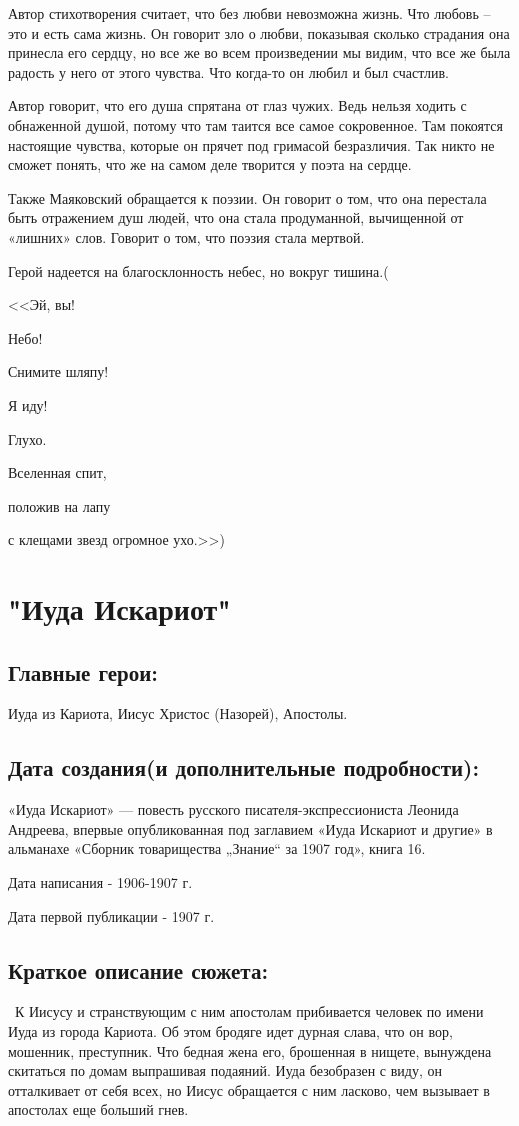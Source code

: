 \documentclass[a4paper,12pt]{article}
\begin{document}
	Автор стихотворения считает, что без любви невозможна жизнь. Что любовь – это и есть сама жизнь. Он говорит зло о любви, показывая сколько страдания она принесла его сердцу, но все же во всем произведении мы видим, что все же была радость у него от этого чувства. Что когда-то он любил и был счастлив.
	
	Автор говорит, что его душа спрятана от глаз чужих. Ведь нельзя ходить с обнаженной душой, потому что там таится все самое сокровенное. Там покоятся настоящие чувства, которые он прячет под гримасой безразличия. Так никто не сможет понять, что же на самом деле творится у поэта на сердце.
	
	Также Маяковский обращается к поэзии. Он говорит о том, что она перестала быть отражением душ людей, что она стала продуманной, вычищенной от «лишних» слов. Говорит о том, что поэзия стала мертвой.
	
	Герой надеется на благосклонность небес, но вокруг тишина.(
	
	<<Эй, вы!
	
	Небо!
	
	Снимите шляпу!
	
	Я иду!
	
	Глухо.
	
	Вселенная спит,
	
	положив на лапу
	
	с клещами звезд огромное ухо.>>)
	
	\section{"Иуда Искариот"}
	\subsection{Главные герои: }
	Иуда из Кариота, Иисус Христос (Назорей), Апостолы.
	\subsection{Дата создания(и дополнительные подробности): }
	«Иуда Искариот» — повесть русского писателя-экспрессиониста Леонида Андреева, впервые опубликованная под заглавием «Иуда Искариот и другие» в альманахе «Сборник товарищества „Знание“ за 1907 год», книга 16. 
	
	\noindent
	Дата написания - 1906-1907 г.
	
	\noindent
	Дата первой публикации - 1907 г.
	
	\subsection{Краткое описание сюжета: }
	\quad \, К Иисусу и странствующим с ним апостолам прибивается человек по имени Иуда из города Кариота. Об этом бродяге идет дурная слава, что он вор, мошенник, преступник. Что бедная жена его, брошенная в нищете, вынуждена скитаться по домам выпрашивая подаяний. Иуда безобразен с виду, он отталкивает от себя всех, но Иисус обращается с ним ласково, чем вызывает в апостолах еще больший гнев.
	
\end{document}
